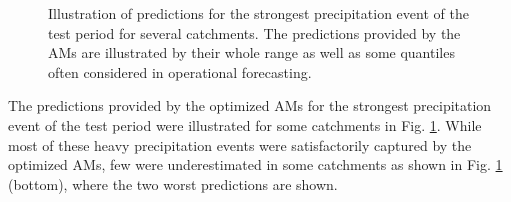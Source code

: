\documentclass[draft]{agujournal2019}
\begin{document}
\begin{figure}[hbtp]
	\noindent{}
	\caption{Illustration of predictions for the strongest precipitation event of the test period for several catchments. The predictions provided by the AMs are illustrated by their whole range as well as some quantiles often considered in operational forecasting.}
	\label{fig_events}
\end{figure}

The predictions provided by the optimized AMs for the strongest precipitation event of the test period were illustrated for some catchments in Fig. \ref{fig_events}. While most of these heavy precipitation events were satisfactorily captured by the optimized AMs, few were underestimated in some catchments as shown in Fig. \ref{fig_events} (bottom), where the two worst predictions are shown.
\end{document}
